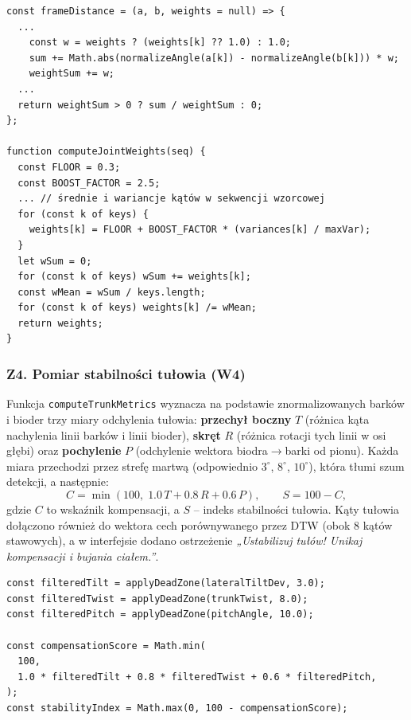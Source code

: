 \documentclass[11pt,a4paper]{article}
\begin{document}
\begin{lstlisting}[caption={Wyznaczanie wag stawów i ważona odległość klatek (\texttt{dtwAnalyzer.js}).}]
const frameDistance = (a, b, weights = null) => {
  ...
    const w = weights ? (weights[k] ?? 1.0) : 1.0;
    sum += Math.abs(normalizeAngle(a[k]) - normalizeAngle(b[k])) * w;
    weightSum += w;
  ...
  return weightSum > 0 ? sum / weightSum : 0;
};

function computeJointWeights(seq) {
  const FLOOR = 0.3;
  const BOOST_FACTOR = 2.5;
  ... // średnie i wariancje kątów w sekwencji wzorcowej
  for (const k of keys) {
    weights[k] = FLOOR + BOOST_FACTOR * (variances[k] / maxVar);
  }
  let wSum = 0;
  for (const k of keys) wSum += weights[k];
  const wMean = wSum / keys.length;
  for (const k of keys) weights[k] /= wMean;
  return weights;
}
\end{lstlisting}

\subsubsection{Z4. Pomiar stabilności tułowia (W4)}
Funkcja \texttt{computeTrunkMetrics} wyznacza na podstawie znormalizowanych barków i bioder trzy miary odchylenia tułowia: \textbf{przechył boczny} $T$ (różnica kąta nachylenia linii barków i linii bioder), \textbf{skręt} $R$ (różnica rotacji tych linii w osi głębi) oraz \textbf{pochylenie} $P$ (odchylenie wektora biodra$\rightarrow$barki od pionu). Każda miara przechodzi przez strefę martwą (odpowiednio $3^\circ$, $8^\circ$, $10^\circ$), która tłumi szum detekcji, a następnie:
\[
C = \min\left(100,\; 1.0\,T + 0.8\,R + 0.6\,P\right), \qquad S = 100 - C,
\]
gdzie $C$ to wskaźnik kompensacji, a $S$ -- indeks stabilności tułowia. Kąty tułowia dołączono również do wektora cech porównywanego przez DTW (obok 8 kątów stawowych), a w interfejsie dodano ostrzeżenie \textit{„Ustabilizuj tułów! Unikaj kompensacji i bujania ciałem.''}.

\begin{lstlisting}[caption={Wyznaczanie wskaźnika kompensacji i indeksu stabilności (\texttt{trunkStability.js}).}]
const filteredTilt = applyDeadZone(lateralTiltDev, 3.0);
const filteredTwist = applyDeadZone(trunkTwist, 8.0);
const filteredPitch = applyDeadZone(pitchAngle, 10.0);

const compensationScore = Math.min(
  100,
  1.0 * filteredTilt + 0.8 * filteredTwist + 0.6 * filteredPitch,
);
const stabilityIndex = Math.max(0, 100 - compensationScore);
\end{lstlisting}
\end{document}

